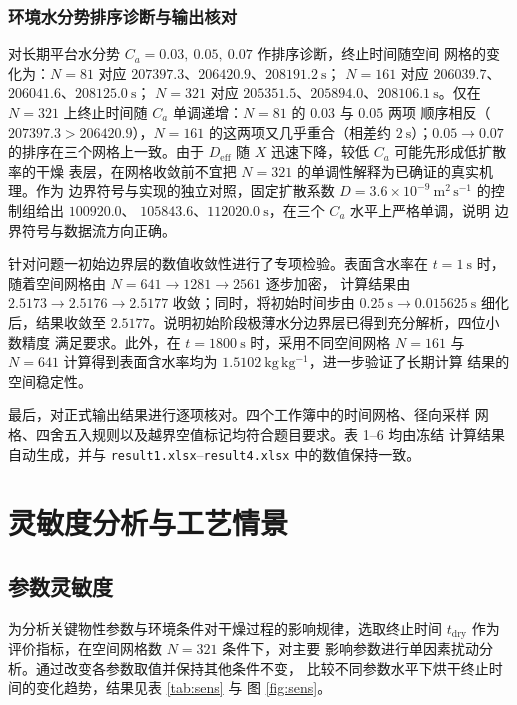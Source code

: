 \documentclass[withoutpreface,bwprint]{cumcmthesis}
\begin{document}
\subsubsection*{环境水分势排序诊断与输出核对}

对长期平台水分势 $C_a=0.03,\ 0.05,\ 0.07$ 作排序诊断，终止时间随空间
网格的变化为：$N=81$ 对应 $207397.3$、$206420.9$、$208191.2\ \mathrm{s}$；
$N=161$ 对应 $206039.7$、$206041.6$、$208125.0\ \mathrm{s}$；
$N=321$ 对应 $205351.5$、$205894.0$、$208106.1\ \mathrm{s}$。仅在
$N=321$ 上终止时间随 $C_a$ 单调递增：$N=81$ 的 $0.03$ 与 $0.05$ 两项
顺序相反（$207397.3>206420.9$），$N=161$ 的这两项又几乎重合（相差约
$2\ \mathrm{s}$）；$0.05\to0.07$ 的排序在三个网格上一致。由于
$D_{\mathrm{eff}}$ 随 $X$ 迅速下降，较低 $C_a$ 可能先形成低扩散率的干燥
表层，在网格收敛前不宜把 $N=321$ 的单调性解释为已确证的真实机理。作为
边界符号与实现的独立对照，固定扩散系数
$D=3.6\times10^{-9}\ \mathrm{m^2\,s^{-1}}$ 的控制组给出 $100920.0$、
$105843.6$、$112020.0\ \mathrm{s}$，在三个 $C_a$ 水平上严格单调，说明
边界符号与数据流方向正确。

针对问题一初始边界层的数值收敛性进行了专项检验。表面含水率在
$t=1\ \mathrm{s}$ 时，随着空间网格由 $N=641\to1281\to2561$ 逐步加密，
计算结果由 $2.5173\to2.5176\to2.5177$ 收敛；同时，将初始时间步由
$0.25\ \mathrm{s}\to0.015625\ \mathrm{s}$ 细化后，结果收敛至
$2.5177$。说明初始阶段极薄水分边界层已得到充分解析，四位小数精度
满足要求。此外，在 $t=1800\ \mathrm{s}$ 时，采用不同空间网格 $N=161$
与 $N=641$ 计算得到表面含水率均为
$1.5102\ \mathrm{kg\,kg^{-1}}$，进一步验证了长期计算
结果的空间稳定性。

最后，对正式输出结果进行逐项核对。四个工作簿中的时间网格、径向采样
网格、四舍五入规则以及越界空值标记均符合题目要求。表 1--6 均由冻结
计算结果自动生成，并与
\texttt{result1.xlsx}--\texttt{result4.xlsx} 中的数值保持一致。

\section{灵敏度分析与工艺情景}

\subsection{参数灵敏度}

为分析关键物性参数与环境条件对干燥过程的影响规律，选取终止时间
$t_{\mathrm{dry}}$ 作为评价指标，在空间网格数 $N=321$ 条件下，对主要
影响参数进行单因素扰动分析。通过改变各参数取值并保持其他条件不变，
比较不同参数水平下烘干终止时间的变化趋势，结果见表 \ref{tab:sens} 与
图 \ref{fig:sens}。
\end{document}
